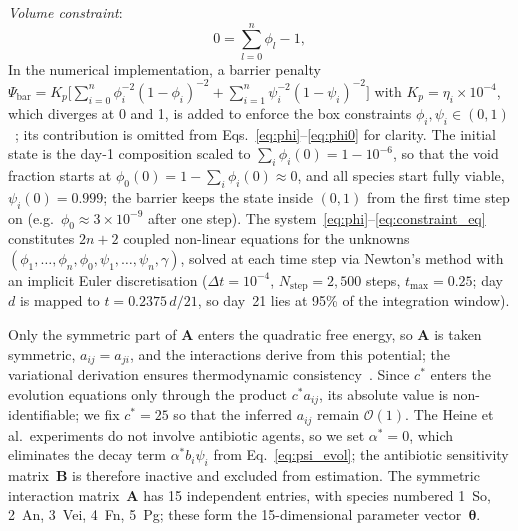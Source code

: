 \documentclass[11pt,a4paper]{article}
\newcommand{\btheta}{\boldsymbol{\theta}}
\begin{document}
\noindent\textit{Volume constraint}:
\begin{equation}
0 = \sum_{l=0}^{n}\phi_l - 1,
\label{eq:constraint_eq}
\end{equation}
In the numerical implementation, a barrier penalty $\Psi_{\mathrm{bar}}=K_p\bigl[\sum_{i=0}^{n}\phi_i^{-2}(1-\phi_i)^{-2}+\sum_{i=1}^{n}\psi_i^{-2}(1-\psi_i)^{-2}\bigr]$ with $K_p=\eta_i\times10^{-4}$, which diverges at 0 and 1, is added to enforce the box constraints $\phi_i,\psi_i\in(0,1)$~\citep{Klempt2025ContinuumBiofilm}; its contribution is omitted from Eqs.~\eqref{eq:phi}--\eqref{eq:phi0} for clarity.
The initial state is the day-1 composition scaled to $\sum_i\phi_i(0)=1-10^{-6}$, so that the void fraction starts at $\phi_0(0)=1-\sum_i\phi_i(0)\approx0$, and all species start fully viable, $\psi_i(0)=0.999$; the barrier keeps the state inside $(0,1)$ from the first time step on (e.g.\ $\phi_0\approx3\times10^{-9}$ after one step).
The system~\eqref{eq:phi}--\eqref{eq:constraint_eq} constitutes $2n+2$ coupled non-linear equations for the unknowns $(\phi_1,\dots,\phi_n,\phi_0,\psi_1,\dots,\psi_n,\gamma)$, solved at each time step via Newton's method with an implicit Euler discretisation ($\Delta t = 10^{-4}$, $N_{\mathrm{step}}=2{,}500$ steps, $t_{\max}=0.25$; day~$d$ is mapped to $t=0.2375\,d/21$, so day~21 lies at 95\% of the integration window).

Only the symmetric part of $\mathbf{A}$ enters the quadratic free energy, so $\mathbf{A}$ is taken symmetric, $a_{ij}=a_{ji}$, and the interactions derive from this potential; the variational derivation ensures thermodynamic consistency~\citep{JunkerBalzani2021ExtendedHamilton}.
Since $c^*$ enters the evolution equations only through the product $c^*a_{ij}$, its absolute value is non-identifiable; we fix $c^*=25$ so that the inferred $a_{ij}$ remain $\mathcal{O}(1)$.
The Heine et al.\ experiments do not involve antibiotic agents, so we set $\alpha^*=0$, which eliminates the decay term $\alpha^*b_i\psi_i$ from Eq.~\eqref{eq:psi_evol}; the antibiotic sensitivity matrix~$\mathbf{B}$ is therefore inactive and excluded from estimation.
The symmetric interaction matrix~$\mathbf{A}$ has 15 independent entries, with species numbered 1~So, 2~An, 3~Vei, 4~Fn, 5~Pg; these form the 15-dimensional parameter vector~$\btheta$.
\end{document}
